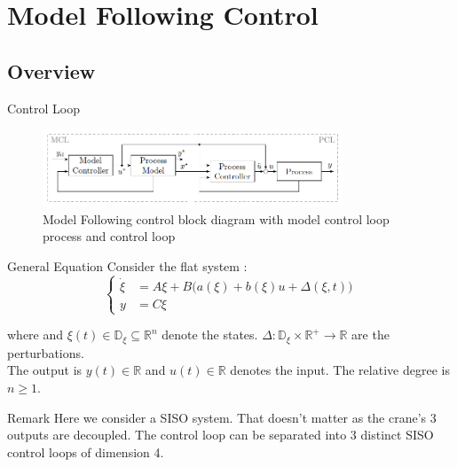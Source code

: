 \section{Model Following Control}

\subsection{Overview}
\begin{frame}{Control Loop}
    \begin{figure}[htb]
        \caption{Model Following control block diagram with model control loop process and control loop \cite{Willkomm2023MFC}}
        \label{fig:MFC Control Loop}
        \centering
        \includegraphics[width=0.8\textwidth]{imgs/MFC/MFC_scheme.PNG}
        \end{figure}
\end{frame}

\begin{frame}{General Equation}
Consider the flat system : 
\begin{equation}
\label{eq:flat_sys_reduced}
\left\{
\begin{aligned}
  \dot{\xi} &= A\xi + B\big(a(\xi) + b(\xi)u + \Delta(\xi, t) \big) \\
  y &= C\xi
\end{aligned}
\right.
\end{equation}



where  and \( \xi(t) \in \mathbb{D}_\xi \subseteq \mathbb{R}^n \) denote the states. 
\(\Delta: \mathbb{D}_{\xi} \times \mathbb{R}^+ \rightarrow \mathbb{R}\) are the perturbations. \\
The output is \( y(t) \in \mathbb{R} \) and \( u(t) \in \mathbb{R} \) denotes the input. The relative degree is \( n \ge 1 \). 

 \begin{block}{Remark}
    Here we consider a SISO system. That doesn't matter as the crane's 3 outputs are decoupled. The control loop can be separated into 3 distinct SISO control loops of dimension 4.
    \end{block}

\end{frame}

